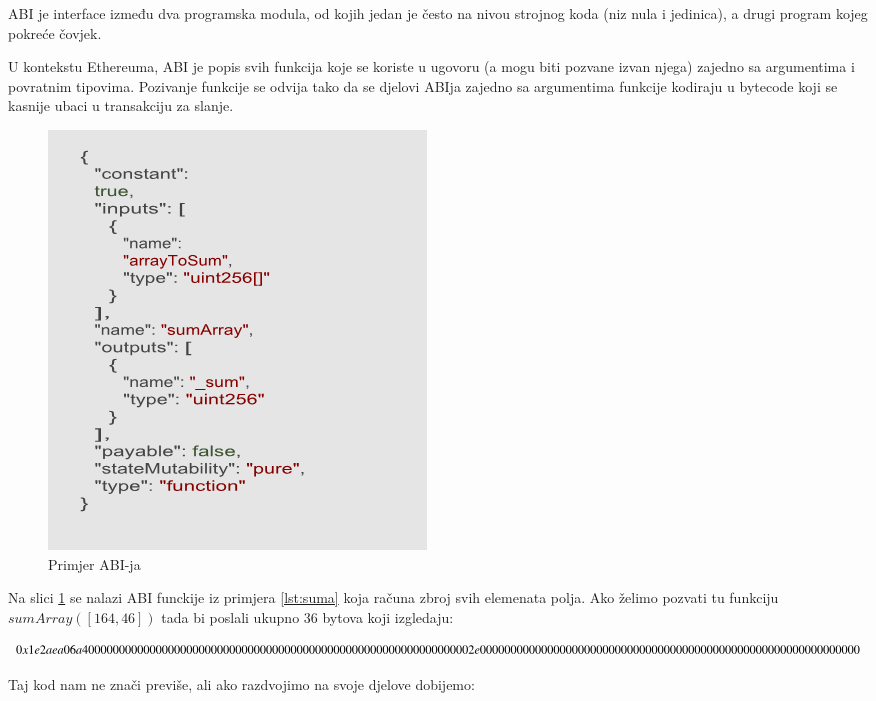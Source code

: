 \documentclass[a4paper,oneside,12pt]{memoir} %
\begin{document}
\begin{definicija}
ABI je interface između dva programska modula, od kojih jedan je često na nivou strojnog koda (niz nula i jedinica), a drugi program kojeg pokreće čovjek. 
\end{definicija}

U kontekstu Ethereuma, ABI je popis svih funkcija koje se koriste u ugovoru (a mogu biti pozvane izvan njega) zajedno sa argumentima i povratnim tipovima. Pozivanje funkcije se odvija tako da se djelovi ABIja zajedno sa argumentima funkcije kodiraju u bytecode koji se kasnije ubaci u transakciju za slanje.

\begin{figure}[H]
\centering
\includegraphics[scale=0.8]{abi}
\caption{Primjer ABI-ja}
\label{fig:abi}
\end{figure}

Na slici \ref{fig:abi} se nalazi ABI funckije iz primjera \ref{lst:suma} koja računa zbroj svih elemenata polja. Ako želimo pozvati tu funkciju $sumArray([164, 46])$ tada bi poslali ukupno 36 bytova koji izgledaju: 


\begin{dmath}
\label{eq:sumabi}
    0x1e2aea06a40000000000000000000000000000000000000000000\\00000000000000000002e000000000000000000000000000000000\\00000000000000000000000000000
\end{dmath}

Taj kod nam ne znači previše, ali ako razdvojimo na svoje djelove dobijemo: 
\end{document}
